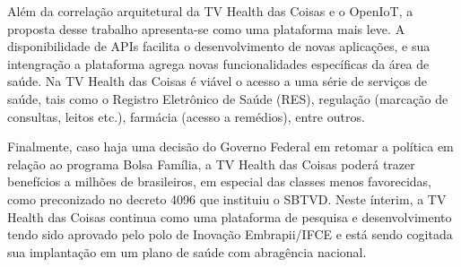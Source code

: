 Além da correlação arquitetural da TV Health das Coisas e o OpenIoT, a proposta
desse trabalho apresenta-se como uma plataforma mais leve. A disponibilidade de
APIs facilita o desenvolvimento de novas aplicações, e sua intengração a plataforma
\nextsaude[] agrega novas funcionalidades específicas da área de saúde. Na TV
Health das Coisas é viável o acesso a uma série de serviços de saúde, tais como 
o Registro Eletrônico de Saúde (RES), regulação (marcação de consultas, leitos etc.),
farmácia (acesso a remédios), entre outros.

Finalmente, caso haja uma decisão do Governo Federal em retomar a política em relação
ao programa Bolsa Família, a TV Health das Coisas poderá trazer benefícios a milhões 
de brasileiros, em especial das classes menos favorecidas, como preconizado no decreto 
4096 que instituiu o SBTVD. Neste ínterim, a TV Health das Coisas continua como
uma plataforma de pesquisa e desenvolvimento tendo sido aprovado pelo polo de Inovação Embrapii/IFCE e está sendo cogitada sua implantação em um plano de saúde com abragência nacional.





